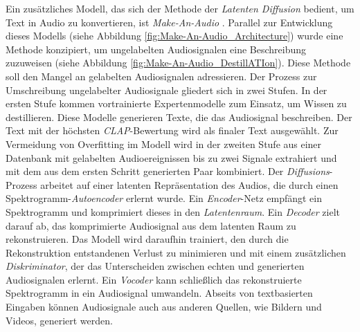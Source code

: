 \documentclass[
  a4paper,  %
  twoside,  %
  bibliography=totoc,
  headsepline,
  cleardoublepage=empty,
  parskip=half,
  draft=false
]{scrbook}
\begin{document}
Ein zusätzliches Modell, das sich der Methode der \emph{Latenten Diffusion}\cite{rombach_high-resolution_2022} bedient, um Text in Audio zu konvertieren, ist \emph{Make-An-Audio} \cite{huang_make--audio_2023}. Parallel zur Entwicklung dieses Modells (siehe Abbildung \ref{fig:Make-An-Audio_Architecture}) wurde eine Methode konzipiert, um ungelabelten Audiosignalen eine Beschreibung zuzuweisen (siehe Abbildung \ref{fig:Make-An-Audio_DestillATIon}). Diese Methode soll den Mangel an gelabelten Audiosignalen adressieren. Der Prozess zur Umschreibung ungelabelter Audiosignale gliedert sich in zwei Stufen. In der ersten Stufe kommen vortrainierte Expertenmodelle \cite{xu_crnn-gru_2020, deshmukh_audio_2022, koepke_audio_2023} zum Einsatz, um Wissen zu destillieren. Diese Modelle generieren Texte, die das Audiosignal beschreiben. Der Text mit der höchsten \emph{CLAP}-Bewertung \cite{elizalde_clap_2022} wird als finaler Text ausgewählt. Zur Vermeidung von Overfitting im Modell wird in der zweiten Stufe aus einer Datenbank mit gelabelten Audioereignissen bis zu zwei Signale extrahiert und mit dem aus dem ersten Schritt generierten Paar kombiniert. Der \emph{Diffusions}-Prozess arbeitet auf einer latenten Repräsentation des Audios, die durch einen Spektrogramm-\emph{Autoencoder} erlernt wurde. Ein \emph{Encoder}-Netz empfängt ein Spektrogramm und komprimiert dieses in den \emph{Latentenraum}. Ein \emph{Decoder} zielt darauf ab, das komprimierte Audiosignal aus dem latenten Raum zu rekonstruieren. Das Modell wird daraufhin trainiert, den durch die Rekonstruktion entstandenen Verlust zu minimieren und mit einem zusätzlichen \emph{Diskriminator}, der das Unterscheiden zwischen echten und generierten Audiosignalen erlernt. Ein \emph{Vocoder} kann schließlich das rekonstruierte Spektrogramm in ein Audiosignal umwandeln. Abseits von textbasierten Eingaben können Audiosignale auch aus anderen Quellen, wie Bildern und Videos, generiert werden.
 
\end{document}
